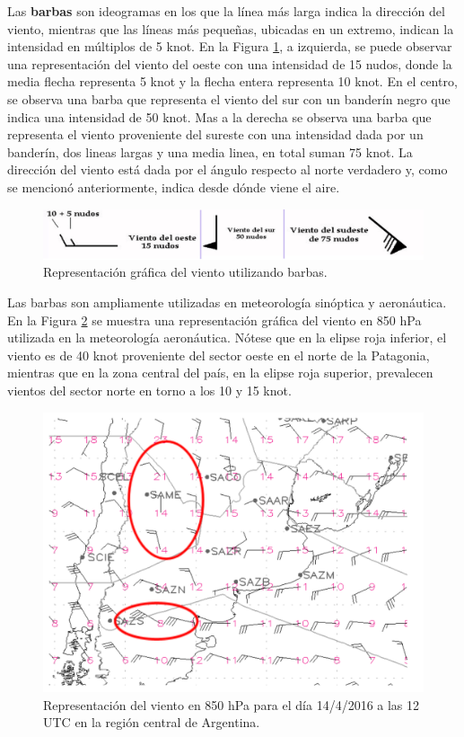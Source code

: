 Las \textbf{barbas} \cite{CursoDeObsevadores} son ideogramas en los que la línea más larga indica la dirección del viento, mientras que las líneas más pequeñas, ubicadas en un extremo, indican la intensidad en múltiplos de 5 \unit{knot}. En la Figura \ref{fig:barbas1}, a izquierda, se puede observar una representación del viento del oeste con una intensidad de 15 nudos, donde la media flecha representa 5 \unit{knot} y la flecha entera representa 10 \unit{knot}. En el centro, se observa una barba que representa el viento del sur con un banderín negro que indica una intensidad de 50 \unit{knot}. Mas a la derecha se observa una barba que representa el viento proveniente del sureste con una intensidad dada por un banderín, dos lineas largas y una media linea, en total suman 75 \unit{knot}. La dirección del viento está dada por el ángulo respecto al norte verdadero y, como se mencionó anteriormente, indica desde dónde viene el aire.

\begin{figure}[H]
    \centering
    \includegraphics[width=1\linewidth]{Figuras/viento/barbas.png}
    \caption{Representación gráfica del viento utilizando barbas. \cite{cursoObservadores2024}}
    \label{fig:barbas1}
\end{figure}

Las barbas son ampliamente utilizadas en meteorología sinóptica y aeronáutica. En la Figura \ref{fig:mapaBarbas} se muestra una representación gráfica del viento en 850 \unit{\hecto\pascal} utilizada en la meteorología aeronáutica. Nótese que en la elipse roja inferior, el viento es de 40 \unit{knot} proveniente del sector oeste en el norte de la Patagonia, mientras que en la zona central del país, en la elipse roja superior, prevalecen vientos del sector norte en torno a los 10 y 15 \unit{knot}.


\begin{figure}[H]
    \centering
    \includegraphics[width=0.85\linewidth]{Figuras/viento/mapaBarbas.png}
    \caption{Representación del viento en 850 \unit{\hecto\pascal} para el día 14/4/2016 a las 12 UTC en la región central de Argentina. \cite{cursoObservadores2024}}
    \label{fig:mapaBarbas}
\end{figure}

